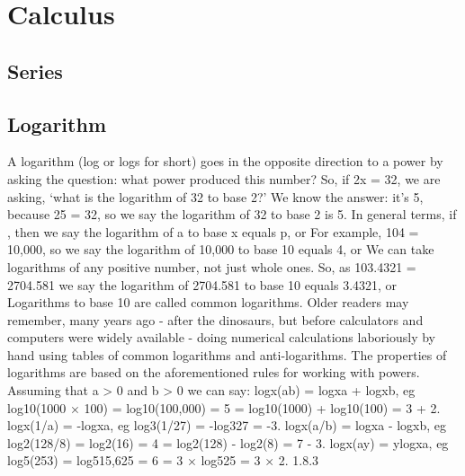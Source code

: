 \chapter{Calculus}

\section{Series}


\section{Logarithm}
A logarithm (log or logs for short) goes in the opposite direction to a power by asking the question: what power produced this number? So, if 2x = 32, we are asking, ‘what is the logarithm of 32 to base 2?’ We know the answer: it's 5, because 25 = 32, so we say the logarithm of 32 to base 2 is 5. In general terms, if , then we say the logarithm of a to base x equals p, or For example, 104 = 10,000, so we say the logarithm of 10,000 to base 10 equals 4, or We can take logarithms of any positive number, not just whole ones. So, as 103.4321 = 2704.581 we say the logarithm of 2704.581 to base 10 equals 3.4321, or Logarithms to base 10 are called common logarithms. Older readers may remember, many years ago - after the dinosaurs, but before calculators and computers were widely available - doing numerical calculations laboriously by hand using tables of common logarithms and anti-logarithms. The properties of logarithms are based on the aforementioned rules for working with powers. Assuming that a > 0 and b > 0 we can say: logx(ab) = logxa + logxb, eg log10(1000 × 100) = log10(100,000) = 5 = log10(1000) + log10(100) = 3 + 2. logx(1/a) = -logxa, eg log3(1/27) = -log327 = -3. logx(a/b) = logxa - logxb, eg log2(128/8) = log2(16) = 4 = log2(128) - log2(8) = 7 - 3. logx(ay) = ylogxa, eg log5(253) = log515,625 = 6 = 3 × log525 = 3 × 2. 1.8.3

